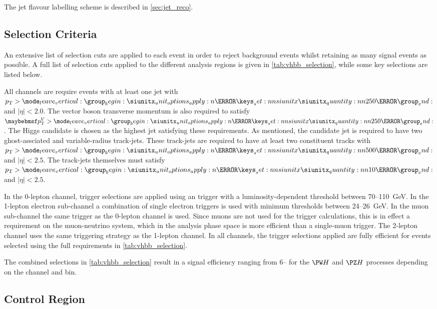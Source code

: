 The jet flavour labelling scheme is described in \cref{sec:jet_reco}.


\subsection{Selection Criteria}\label{sec:vhbb_selections}

An extensive list of selection cuts are applied to each event in order to reject background events whilst retaining as many signal events as possible. 
A full list of selection cuts applied to the different analysis regions is given in \cref{tab:vhbb_selection}, while some key selections are listed below.

All channels are require events with at least one \largeR jet with $\pt > \SI{250}{\GeV}$ and $|\eta| < 2.0$.
The vector boson transverse momentum is also required to satisfy $\ptv > \SI{250}{\GeV}$.
The Higgs candidate is chosen as the highest \pt \largeR jet satisfying these requirements.
As mentioned, the candidate \largeR jet is required to have two ghost-assciated and \btagged variable-radius track-jets.
These track-jets are required to have at least two constituent tracks with $\pt > \SI{500}{\MeV}$ and $|\eta| < 2.5$.
The track-jets themselves must satisfy $\pt > \SI{10}{\GeV}$ and $|\eta| < 2.5$.

In the 0-lepton channel, trigger selections are applied using an \ETmiss trigger with a luminosity-dependent threshold between 70--\SI{110}{\GeV}.
In the 1-lepton electron sub-channel a combination of single electron triggers is used with minimum \pt thresholds between 24--\SI{26}{\GeV}.
In the muon sub-channel the same \ETmiss trigger as the 0-lepton channel is used.
Since muons are not used for the \ETmiss trigger calculations, this is in effect a \pt requirement on the muon-neutrino system, which in the analysis phase space is more efficient than a single-muon trigger.
The 2-lepton channel uses the same triggering strategy as the 1-lepton channel.
In all channels, the trigger selections applied are fully efficient for events selected using the full requirements in \cref{tab:vhbb_selection}.

The combined selections in \cref{tab:vhbb_selection} result in a signal efficiency ranging from 6-- for the $\Wboson\higgs$ and $\Zboson\higgs$ processes depending on the channel and \ptv bin.

%

%

\subsection{Control Region}\label{sec:vhbb_control_region}

